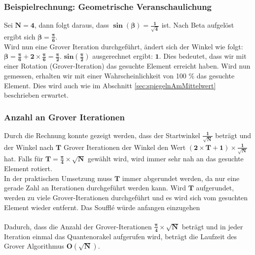 \subsubsection{Beispielrechnung: Geometrische Veranschaulichung}
Sei $\mathbf{N=4}$, dann folgt daraus, dass $\mathbf{\sin(\beta) = \frac{1}{\sqrt{4}}}$ ist. Nach Beta aufgelöst ergibt sich $\mathbf{\beta = \frac{\pi}{6}}$.
\\
Wird nun eine Grover Iteration durchgeführt, ändert sich der Winkel wie folgt: $\mathbf{\beta = \frac{\pi}{6} + 2 \times \frac{\pi}{6}  = \frac{\pi}{2}}$. $\mathbf{sin(\frac{\pi}{2})}$ ausgerechnet ergibt: $\mathbf{1}$. Dies bedeutet, dass wir mit einer Rotation (Grover-Iteration) das gesuchte Element erreicht haben. Wird nun gemessen, erhalten wir mit einer Wahrscheinlichkeit von 100 \% das gesuchte Element. Dies wird auch wie im Abschnitt  \ref{sec:spiegelnAmMittelwert}  beschrieben erwartet.

\subsubsection{Anzahl an Grover Iterationen}
Durch die Rechnung konnte gezeigt werden, dass der Startwinkel $\mathbf{\frac{1}{\sqrt{N}}}$ beträgt und der Winkel nach $\mathbf{T}$ Grover Iterationen der Winkel den Wert $\mathbf{(2 \times T + 1)\times \frac{1}{\sqrt{N}}}$ hat. 
Falls für $\mathbf{T = \frac{\pi}{4}\times \sqrt{N}}$ gewählt wird, wird immer sehr nah an das gesuchte Element rotiert. 
\\
In der praktischen Umsetzung muss $\mathbf{T}$ immer abgerundet werden, da nur eine gerade Zahl an Iterationen durchgeführt werden kann. Wird $\mathbf{T}$ aufgerundet, werden zu viele Grover-Iterationen durchgeführt und es wird sich vom gesuchten Element wieder entfernt. \cite[S. 157]{KLM07} Das Souffl\'{e} würde anfangen einzugehen
\\
\\
Dadurch, dass die Anzahl der Grover-Iterationen $\mathbf{ \frac{\pi}{4}\times \sqrt{N}}$ beträgt und in jeder Iteration einmal das Quantenorakel aufgerufen wird, beträgt die Laufzeit des Grover Algorithmus $\mathbf{O(\sqrt N)}$.


